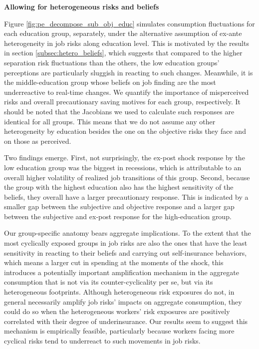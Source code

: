 \textbf{Allowing for heterogeneous risks and beliefs} 

Figure \ref{fig:pe_decompose_sub_obj_educ} simulates consumption fluctuations for each education group, separately, under the alternative assumption of ex-ante heterogeneity in job risks along education level. This is motivated by the results in section \ref{subsec:hetero_beliefs}, which suggests that compared to the higher separation risk fluctuations than the others, the low education groups' perceptions are particularly sluggish in reacting to such changes. Meanwhile, it is the middle-education group whose beliefs on job finding are the most underreactive to real-time changes. We quantify the importance of misperceived risks and overall precautionary saving motives for each group, respectively.  It should be noted that the Jacobians we used to calculate such responses are identical for all groups. This means that we do not assume any other heterogeneity by education besides the one on the objective risks they face and on those as perceived. 

Two findings emerge. First, not surprisingly, the ex-post shock response by the low education group was the biggest in recessions, which is attributable to an overall higher volatility of realized job transitions of this group. Second, because the group with the highest education also has the highest sensitivity of the beliefs, they overall have a larger precautionary response. This is indicated by a smaller gap between the subjective and objective response and a larger gap between the subjective and ex-post response for the high-education group. 

Our group-specific anatomy bears aggregate implications. To the extent that the most cyclically exposed groups in job risks are also the ones that have the least sensitivity in reacting to their beliefs and carrying out self-insurance behaviors, which means a larger cut in spending at the moments of the shock, this introduces a potentially important amplification mechanism in the aggregate consumption that is not via its counter-cyclicality per se, but via its heterogeneous footprints. Although heterogeneous risk exposures do not, in general necessarily amplify job risks' impacts on aggregate consumption, they could do so when the heterogeneous workers' risk exposures are positively correlated with their degree of underinsurance. Our results seem to suggest this mechanism is empirically feasible, particularly because workers facing more cyclical risks tend to underreact to such movements in job risks. 


